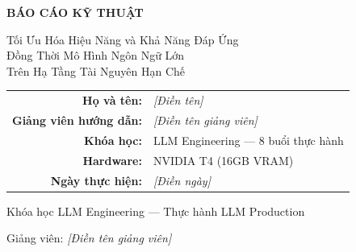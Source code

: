 \documentclass[12pt,a4paper]{report}
\begin{document}
\begin{titlepage}
\centering
\vspace*{2cm}


\vspace{1cm}
{\Huge\bfseries\color{blue!70!black} BÁO CÁO KỸ THUẬT\par}
\vspace{0.5cm}
{\LARGE\color{blue!50!black} Tối Ưu Hóa Hiệu Năng và Khả Năng Đáp Ứng\\Đồng Thời Mô Hình Ngôn Ngữ Lớn\\Trên Hạ Tầng Tài Nguyên Hạn Chế\par}

\vspace{1cm}

\vspace{2cm}

\begin{tabular}{rl}
  \textbf{Họ và tên:} & \textit{[Điền tên]} \\[6pt]
  \textbf{Giảng viên hướng dẫn:} & \textit{[Điền tên giảng viên]} \\[6pt]
  \textbf{Khóa học:} & LLM Engineering --- 8 buổi thực hành \\[6pt]
  \textbf{Hardware:} & NVIDIA T4 (16GB VRAM) \\[6pt]
  \textbf{Ngày thực hiện:} & \textit{[Điền ngày]} \\
\end{tabular}

\vfill

{\large\color{gray} Khóa học LLM Engineering --- Thực hành LLM Production\par}
{\large\color{gray} Giảng viên: \textit{[Điền tên giảng viên]}\par}

\end{titlepage}

\tableofcontents
\newpage

\listoftables
\newpage

\listoffigures
\newpage

\end{document}

